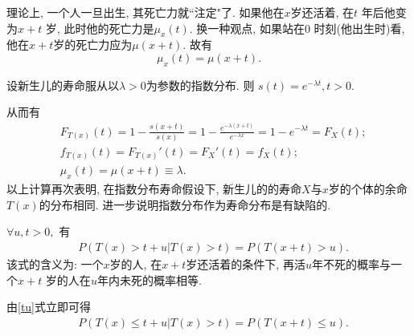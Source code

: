 \documentclass[lang=cn,10pt]{elegantbook}
\begin{document}
\begin{remark}
    理论上, 一个人一旦出生, 其死亡力就``注定"了. 如果他在$x$岁还活着, 在$t$ 年后他变为$x+t$ 岁, 此时他的死亡力是$\mu_x(t).$ 换一种观点, 如果站在0 时刻(他出生时)看, 他在$x+t$岁的死亡力应为$\mu(x+t).$ 故有
    $$\mu_x(t)=\mu(x+t).$$
\end{remark}

\begin{example}
    设新生儿的寿命服从以$\lambda>0$为参数的指数分布. 则
    $s(t)=e^{-\lambda t}, t>0.$
\end{example}
\begin{solution}
	从而有
    \begin{align*}
         & F_{T(x)}(t)=1-\frac{s(x+t)}{s(x)}=1-\frac{e^{-\lambda(x+t)}}{e^{-\lambda x}}=1-e^{-\lambda t} =F_X(t); \\
         & f_{T(x)}(t)=F_{T(x)}'(t)=F_X'(t)=f_X(t);   \\
         & \mu_x(t)=\mu(x+t)\equiv\lambda.
    \end{align*}
    以上计算再次表明, 在指数分布寿命假设下, 新生儿的的寿命$X$与$x$岁的个体的余命$T(x)$的分布相同. 进一步说明指数分布作为寿命分布是有缺陷的.
\end{solution}

\begin{proposition}$\forall u,t>0,$ 有
    \begin{align}
         & P(T(x)>t+u|T(x)>t)=P(T(x+t)>u).\label{tu}
    \end{align}
    该式的含义为: 一个$x$岁的人, 在$x+t$岁还活着的条件下, 再活$u$年不死的概率与一个$x+t$ 岁的人在$u$年内未死的概率相等.
\end{proposition}

\begin{remark}由\eqref{tu}式立即可得
    \begin{align}\label{tul}
         & P(T(x)\leq t+u|T(x)>t)=P(T(x+t)\leq u).
    \end{align}
\end{remark}
\end{document}
